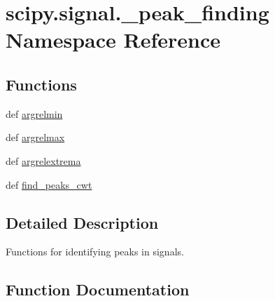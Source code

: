 \hypertarget{namespacescipy_1_1signal_1_1__peak__finding}{}\section{scipy.\+signal.\+\_\+peak\+\_\+finding Namespace Reference}
\label{namespacescipy_1_1signal_1_1__peak__finding}
\subsection*{Functions}
\begin{DoxyCompactItemize}
\item 
def \hyperlink{namespacescipy_1_1signal_1_1__peak__finding_a6d96eb9d3ff71b8fab335c1e2aa9c578}{argrelmin}
\item 
def \hyperlink{namespacescipy_1_1signal_1_1__peak__finding_aa6f97343ee96f0430c88bc4af8a18766}{argrelmax}
\item 
def \hyperlink{namespacescipy_1_1signal_1_1__peak__finding_ad2054e7fee29a0b211d4001de76ba916}{argrelextrema}
\item 
def \hyperlink{namespacescipy_1_1signal_1_1__peak__finding_a5ef1b2fe6fbcdc48f6d5fd94bb7be272}{find\+\_\+peaks\+\_\+cwt}
\end{DoxyCompactItemize}


\subsection{Detailed Description}
\begin{DoxyVerb}Functions for identifying peaks in signals.
\end{DoxyVerb}
 

\subsection{Function Documentation}
\hypertarget{namespacescipy_1_1signal_1_1__peak__finding_ad2054e7fee29a0b211d4001de76ba916}{}
